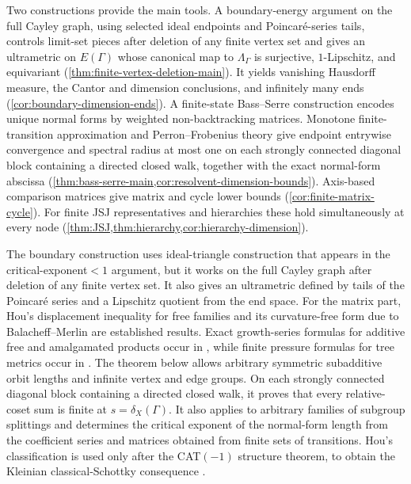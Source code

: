 \documentclass[11pt]{article}
\theoremstyle{definition}
\begin{document}
Two constructions provide the main tools.  A boundary-energy argument on the full Cayley
graph, using selected ideal endpoints and Poincar\'e-series tails, controls limit-set pieces
after deletion of any finite vertex set and gives an ultrametric on $E(\Gamma)$ whose
canonical map to $\Lambda_\Gamma$ is surjective, $1$-Lipschitz, and equivariant
(\cref{thm:finite-vertex-deletion-main}).  It yields vanishing Hausdorff measure, the Cantor
and dimension conclusions, and infinitely many ends (\cref{cor:boundary-dimension-ends}).
A finite-state Bass--Serre construction encodes unique normal forms by weighted
non-backtracking matrices.  Monotone finite-transition approximation and
Perron--Frobenius theory give endpoint entrywise convergence and spectral radius at most one
on each strongly connected diagonal block containing a directed closed walk, together with
the exact normal-form abscissa (\cref{thm:bass-serre-main,cor:resolvent-dimension-bounds}).
Axis-based comparison matrices give matrix and cycle lower bounds
(\cref{cor:finite-matrix-cycle}). For finite JSJ representatives and hierarchies these hold
simultaneously at every node (\cref{thm:JSJ,thm:hierarchy,cor:hierarchy-dimension}).

The boundary construction
uses ideal-triangle construction that appears in the critical-exponent$<1$ argument,
but it works on the full Cayley graph after deletion of any finite vertex set.  It also gives an
ultrametric defined by tails of the Poincar\'e series and a Lipschitz quotient from the end
space. For the matrix part, Hou's displacement inequality for free families
\cite[Theorem~1.1]{Hou2001} and its curvature-free form due to Balacheff--Merlin
\cite[Theorem~1]{BalacheffMerlin2023} are established results.  Exact growth-series formulas for
additive free and amalgamated products occur in \cite{AllenEtAl2011}, while finite pressure
formulas for tree metrics occur in \cite{HersonskyHubbard1997}. The theorem below allows arbitrary
symmetric subadditive orbit lengths and infinite vertex and edge groups.  On each strongly
connected diagonal block containing a directed closed walk, it proves that every relative-coset
sum is finite at $s=\delta_X(\Gamma)$.  It also applies to arbitrary families of subgroup
splittings and determines the critical exponent of the normal-form length from the coefficient
series and matrices obtained from finite sets of transitions.  Hou's classification is used only after the CAT$(-1)$
structure theorem, to obtain the Kleinian classical-Schottky consequence \cite{Hou2023}.
\end{document}
